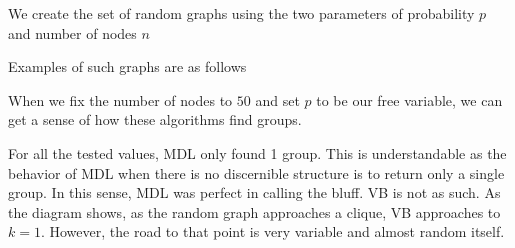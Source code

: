 We create the set of random graphs using the two parameters
of probability $p$ and number of nodes $n$

Examples of such graphs are as follows




When we fix the number of nodes to $50$ and set $p$ to be our
free variable, we can get a sense of how these algorithms find
groups.



For all the tested values, MDL only found 1 group. This is understandable
as the behavior of MDL when there is no discernible structure is to
return only a single group. In this sense, MDL was perfect in calling
the bluff. VB is not as such. As the diagram shows, as the random
graph approaches a clique, VB approaches to $k=1$. However, the road to
that point is very variable and almost random itself.
